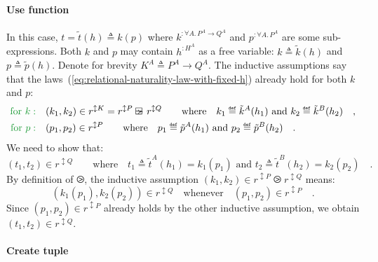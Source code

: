 \paragraph{Use function}

In this case, $t=\tilde{t}(h)\triangleq k(p)$ where $k^{:\forall A.\,P^{A}\rightarrow Q^{A}}$
and $p^{:\forall A.\,P^{A}}$ are some sub-expressions. Both $k$
and $p$ may contain $h^{:H^{A}}$ as a free variable: $k\triangleq\tilde{k}(h)$
and $p\triangleq\tilde{p}(h)$. Denote for brevity $K^{A}\triangleq P^{A}\rightarrow Q^{A}$.
The inductive assumptions say that the laws~(\ref{eq:relational-naturality-law-with-fixed-h})
already hold for both $k$ and $p$:
\begin{align*}
{\color{greenunder}\text{for }k:}\quad & (k_{1},k_{2})\in r^{\updownarrow K}=r^{\updownarrow P}\ogreaterthan r^{\updownarrow Q}\quad\quad\text{where}\quad k_{1}\triangleq\tilde{k}^{A}(h_{1})\text{ and }k_{2}\triangleq\tilde{k}^{B}(h_{2})\quad,\\
{\color{greenunder}\text{for }p:}\quad & (p_{1},p_{2})\in r^{\updownarrow P}\quad\quad\text{where}\quad p_{1}\triangleq\tilde{p}^{A}(h_{1})\text{ and }p_{2}\triangleq\tilde{p}^{B}(h_{2})\quad.
\end{align*}
We need to show that:
\[
(t_{1},t_{2})\in r^{\updownarrow Q}\quad\quad\text{where}\quad t_{1}\triangleq\tilde{t}^{A}(h_{1})=k_{1}(p_{1})\text{ and }t_{2}\triangleq\tilde{t}^{B}(h_{2})=k_{2}(p_{2})\quad.
\]
By definition of $\ogreaterthan$, the inductive assumption $(k_{1},k_{2})\in r^{\updownarrow P}\ogreaterthan r^{\updownarrow Q}$
means:
\[
(k_{1}(p_{1}),k_{2}(p_{2}))\in r^{\updownarrow Q}\quad\text{whenever}\quad(p_{1},p_{2})\in r^{\updownarrow P}\quad.
\]
Since $(p_{1},p_{2})\in r^{\updownarrow P}$ already holds by the
other inductive assumption, we obtain $(t_{1},t_{2})\in r^{\updownarrow Q}$.

\paragraph{Create tuple}

